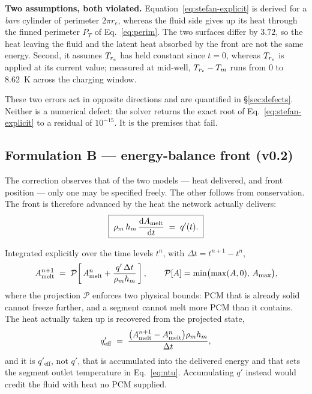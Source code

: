 \medskip
\noindent\textbf{Two assumptions, both violated.} Equation~\eqref{eq:stefan-explicit}
is derived for a \emph{bare} cylinder of perimeter $2\pi r_{e}$, whereas the
fluid side gives up its heat through the finned perimeter $P_{T}$ of
Eq.~\eqref{eq:perim}. The two surfaces differ by $3.72$, so the heat leaving the
fluid and the latent heat absorbed by the front are not the same energy. Second,
it assumes $T_{r_{e}}$ has held constant since $t=0$, whereas $T_{r_{e}}$ is applied at its
current value; measured at mid-well, $T_{r_{e}}-T_{m}$ runs from $0$ to
\SI{8.62}{\kelvin} across the charging window.

These two errors act in opposite directions and are quantified in
\S\ref{sec:defects}. Neither is a numerical defect: the solver returns the exact
root of Eq.~\eqref{eq:stefan-explicit} to a residual of $10^{-15}$. It is the
premises that fail.

\subsection{Formulation B --- energy-balance front (v0.2)}
\label{sec:front:marched}

The correction observes that of the two models --- heat delivered, and front
position --- only one may be specified freely. The other follows from
conservation. The front is therefore advanced by the heat the network actually
delivers:
\begin{equation}
  \boxed{\;
  \rho_{m}\,h_{m}\,\frac{\mathrm{d}A_{\mathrm{melt}}}{\mathrm{d}t} \;=\; q'(t) .
  \;}
  \label{eq:marched}
\end{equation}

Integrated explicitly over the time levels $t^{n}$, with $\Delta t = t^{n+1}-t^{n}$,
\begin{equation}
  A_{\mathrm{melt}}^{n+1}
  \;=\;
  \mathcal{P}\!\left[\,A_{\mathrm{melt}}^{n} + \frac{q'\,\Delta t}{\rho_{m} h_{m}}\,\right],
  \qquad
  \mathcal{P}[A] = \min\bigl(\max(A,0),\,A_{\max}\bigr),
  \label{eq:advance}
\end{equation}
where the projection $\mathcal{P}$ enforces two physical bounds: PCM that is
already solid cannot freeze further, and a segment cannot melt more PCM than it
contains. The heat actually taken up is recovered from the projected state,
\begin{equation}
  q'_{\mathrm{eff}}
  \;=\;
  \frac{\bigl(A_{\mathrm{melt}}^{n+1}-A_{\mathrm{melt}}^{n}\bigr)\rho_{m} h_{m}}{\Delta t},
  \label{eq:qeff}
\end{equation}
and it is $q'_{\mathrm{eff}}$, not $q'$, that is accumulated into the delivered
energy and that sets the segment outlet temperature in Eq.~\eqref{eq:ntu}.
Accumulating $q'$ instead would credit the fluid with heat no PCM supplied.

